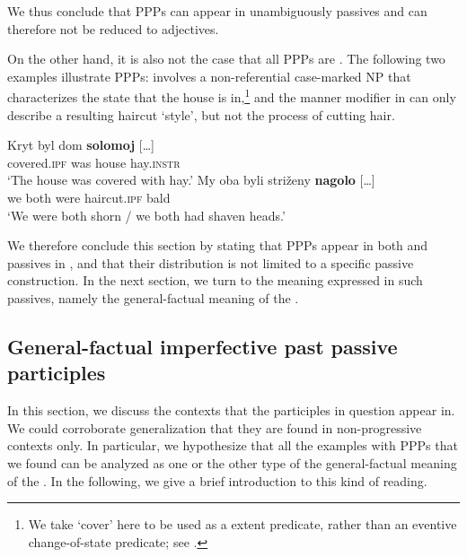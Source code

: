 \documentclass[output=paper,modfonts,newtxmath,hidelinks]{langscibook}
\begin{document}
\noindent We thus conclude that  PPPs can appear in unambiguously  passives and can therefore not be reduced to adjectives. 

On the other hand, it is also not the case that all  PPPs are . The following two examples illustrate  PPPs:  involves a non-referential  case-marked NP that characterizes the state that the house is in,\footnote{We take `cover' here to be used as a  extent predicate, rather than an eventive change-of-state predicate; see \citet{gawron09}.} and the  manner modifier in  can only describe a resulting haircut `style', but not the process of cutting hair.

\ea\label{kryt}
\ea\gll 	Kryt byl dom \textbf{solomoj} [\dots]\\ 		
	covered.\textsc{ipf} was house hay.\textsc{instr} 	\\
\glt	`The house was covered with hay.'\label{kryta}
\ex\gll	My oba byli striženy \textbf{nagolo} [\dots]\\
	we both were haircut.\textsc{ipf} bald\\
\glt	`We were both shorn / we both had shaven heads.'\label{nagolo} 
\z\z

\noindent We therefore conclude this section by stating that  PPPs appear in both  and  passives in , and that their distribution is not limited to a specific passive construction. In the next section, we turn to the meaning expressed in such passives, namely the general-factual meaning of the .

\subsection{General-factual imperfective past passive participles} 
\label{whichIPF}

In this section, we discuss the  contexts that the participles in question appear in. We could corroborate  generalization that they are found in non-progressive  contexts only. In particular, we hypothesize that all the examples with  PPPs that we found can be analyzed as one or the other type of the general-factual meaning of the . In the following, we give a brief introduction to this kind of reading.
\end{document}
